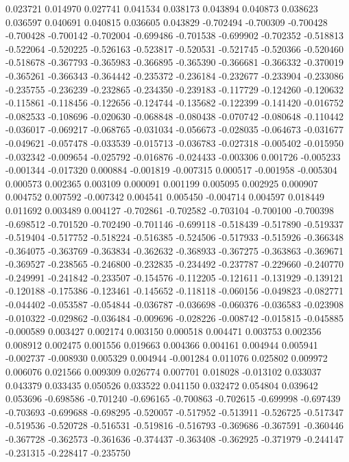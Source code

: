 0.023721
0.014970
0.027741
0.041534
0.038173
0.043894
0.040873
0.038623
0.036597
0.040691
0.040815
0.036605
0.043829
-0.702494
-0.700309
-0.700428
-0.700428
-0.700142
-0.702004
-0.699486
-0.701538
-0.699902
-0.702352
-0.518813
-0.522064
-0.520225
-0.526163
-0.523817
-0.520531
-0.521745
-0.520366
-0.520460
-0.518678
-0.367793
-0.365983
-0.366895
-0.365390
-0.366681
-0.366332
-0.370019
-0.365261
-0.366343
-0.364442
-0.235372
-0.236184
-0.232677
-0.233904
-0.233086
-0.235755
-0.236239
-0.232865
-0.234350
-0.239183
-0.117729
-0.124260
-0.120632
-0.115861
-0.118456
-0.122656
-0.124744
-0.135682
-0.122399
-0.141420
-0.016752
-0.082533
-0.108696
-0.020630
-0.068848
-0.080438
-0.070742
-0.080648
-0.110442
-0.036017
-0.069217
-0.068765
-0.031034
-0.056673
-0.028035
-0.064673
-0.031677
-0.049621
-0.057478
-0.033539
-0.015713
-0.036783
-0.027318
-0.005402
-0.015950
-0.032342
-0.009654
-0.025792
-0.016876
-0.024433
-0.003306
0.001726
-0.005233
-0.001344
-0.017320
0.000884
-0.001819
-0.007315
0.000517
-0.001958
-0.005304
0.000573
0.002365
0.003109
0.000091
0.001199
0.005095
0.002925
0.000907
0.004752
0.007592
-0.007342
0.004541
0.005450
-0.004714
0.004597
0.018449
0.011692
0.003489
0.004127
-0.702861
-0.702582
-0.703104
-0.700100
-0.700398
-0.698512
-0.701520
-0.702490
-0.701146
-0.699118
-0.518439
-0.517890
-0.519337
-0.519404
-0.517752
-0.518224
-0.516385
-0.524506
-0.517933
-0.515926
-0.366348
-0.364075
-0.363769
-0.363834
-0.362632
-0.368933
-0.367275
-0.363863
-0.369671
-0.369527
-0.238565
-0.246800
-0.232835
-0.234492
-0.237787
-0.229660
-0.240770
-0.249991
-0.241842
-0.233507
-0.154576
-0.112205
-0.121611
-0.131929
-0.139121
-0.120188
-0.175386
-0.123461
-0.145652
-0.118118
-0.060156
-0.049823
-0.082771
-0.044402
-0.053587
-0.054844
-0.036787
-0.036698
-0.060376
-0.036583
-0.023908
-0.010322
-0.029862
-0.036484
-0.009696
-0.028226
-0.008742
-0.015815
-0.045885
-0.000589
0.003427
0.002174
0.003150
0.000518
0.004471
0.003753
0.002356
0.008912
0.002475
0.001556
0.019663
0.004366
0.004161
0.004944
0.005941
-0.002737
-0.008930
0.005329
0.004944
-0.001284
0.011076
0.025802
0.009972
0.006076
0.021566
0.009309
0.026774
0.007701
0.018028
-0.013102
0.033037
0.043379
0.033435
0.050526
0.033522
0.041150
0.032472
0.054804
0.039642
0.053696
-0.698586
-0.701240
-0.696165
-0.700863
-0.702615
-0.699998
-0.697439
-0.703693
-0.699688
-0.698295
-0.520057
-0.517952
-0.513911
-0.526725
-0.517347
-0.519536
-0.520728
-0.516531
-0.519816
-0.516793
-0.369686
-0.367591
-0.360446
-0.367728
-0.362573
-0.361636
-0.374437
-0.363408
-0.362925
-0.371979
-0.244147
-0.231315
-0.228417
-0.235750
